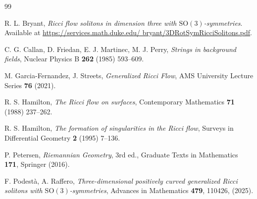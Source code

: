 \documentclass[12pt,a4paper,reqno]{amsart}
\theoremstyle{plain}
\theoremstyle{remark}
\numberwithin{equation}{section}
\newcommand{\SO}{\mathrm{SO}}
\begin{document}
\begin{thebibliography}{99}

 R. L. Bryant, \emph{Ricci flow solitons in dimension three with $\SO(3)$-symmetries}. Available at
\url{https://services.math.duke.edu/ bryant/3DRotSymRicciSolitons.pdf}.

 C. G. Callan, D. Friedan, E. J. Martinec, M. J. Perry, \emph{Strings in background fields}, Nuclear Physics B \textbf{262} (1985) 593--609.

 M. Garcia-Fernandez, J. Streets, \emph{Generalized Ricci Flow}, AMS University Lecture Series \textbf{76} (2021).

 R. S. Hamilton, \emph{The Ricci flow on surfaces}, Contemporary Mathematics \textbf{71} (1988) 237--262.

 R. S. Hamilton, \emph{The formation of singularities in the Ricci flow}, Surveys in Differential Geometry \textbf{2} (1995) 7--136.





 P. Petersen, \emph{Riemannian Geometry}, 3rd ed., Graduate Texts in Mathematics \textbf{171}, Springer (2016).

 F. Podest\`a, A. Raffero, \emph{Three-dimensional positively curved generalized Ricci solitons with $\SO(3)$-symmetries}, Advances in Mathematics \textbf{479}, 110426, (2025).

\end{thebibliography}
\end{document}
